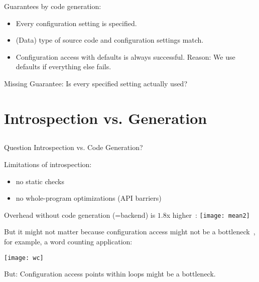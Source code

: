 \begin{frame}
	Guarantees by code generation:
	\begin{itemize}
	\item Every configuration setting is specified.
	\item (Data) type of source code and configuration settings match.
	\item Configuration access with defaults is always successful.
	Reason: We use defaults if everything else fails.
	\end{itemize}
	\vspace{3em}
	Missing Guarantee: Is every specified setting actually used?
\end{frame}



\section{Introspection vs. Generation}

\subsection{}

\begin{frame}
	\begin{alertblock}{Question}
	Introspection vs. Code Generation?
	\end{alertblock}
\end{frame}

\begin{frame}
	Limitations of introspection:
	\begin{itemize}
	\item no static checks
	\item no whole-program optimizations (API barriers)
	\end{itemize}
\end{frame}

\begin{frame}
	Overhead without code generation (=backend) is $1.8$x higher~\cite{raab2015kps}:
	\texttt{[image: mean2]}
\end{frame}

\begin{frame}
	But it might not matter because configuration access might not be a bottleneck~\cite{raab2015kps},
	for example, a word counting application:

	\texttt{[image: wc]}

	But: \pause
	Configuration access points within loops might be a bottleneck.
\end{frame}

